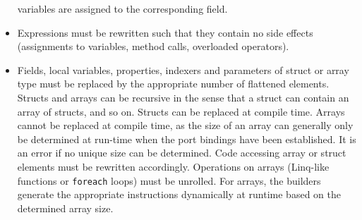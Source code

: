 \documentclass[a4paper,10pt,english]{article}
\begin{document}
\begin{itemize}
	variables are assigned to the corresponding field.
	\item Expressions must be rewritten such that they contain no side effects (assignments to variables, method calls, overloaded
	operators).
	\item Fields, local variables, properties, indexers and parameters of struct or array type must be replaced by the appropriate
	number of flattened elements. Structs and arrays can be recursive in the sense that a struct can contain an array of structs,
	and so on. Structs can be replaced at compile time. Arrays cannot be replaced at compile time, as the size of an array can
	generally only be determined at run-time when the port bindings have been established. It is an error if no unique size can be
	determined. Code accessing array or struct elements must be rewritten accordingly. Operations on arrays (Linq-like functions or
	\texttt{foreach} loops) must be unrolled. For arrays, the builders generate the appropriate instructions dynamically at runtime
	based on the determined array size.
\end{itemize}
\end{document}
